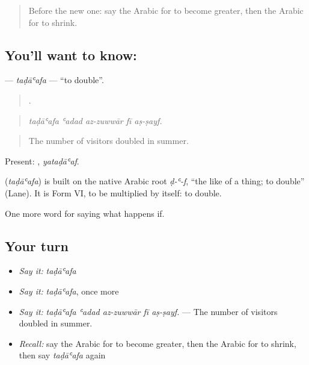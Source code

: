 \label{lesson:AR-C412-tadaafa}



\begin{quote}
Before the new one: say the Arabic for to become greater, then the Arabic for to shrink.
\end{quote}

\subsection*{You'll want to know: }
\textbf{} — \emph{taḍāʿafa} — \textquotedblleft{}to double\textquotedblright{}.

\begin{quote}
    .
\end{quote}

\begin{quote}
\emph{taḍāʿafa ʿadad az-zuwwār fī aṣ-ṣayf.}
\end{quote}

\begin{quote}
The number of visitors doubled in summer.
\end{quote}

Present: , \emph{yataḍāʿaf}.

\begin{cousinweb}
\textbf{} (\emph{taḍāʿafa}) is built on the native Arabic root \emph{ḍ-ʿ-f}, \textquotedblleft{}the like of a thing; to double\textquotedblright{} (Lane). It is Form VI, to be multiplied by itself: to double.
\end{cousinweb}

\begin{grammarlens}[title={What you've built}]
One more word for saying what happens if.
\end{grammarlens}

\subsection*{Your turn}
\begin{itemize}
\raggedright
  \item \emph{Say it:} \emph{taḍāʿafa}
  \item \emph{Say it:} \emph{taḍāʿafa}, once more
  \item \emph{Say it:} \emph{taḍāʿafa ʿadad az-zuwwār fī aṣ-ṣayf.} — The number of visitors doubled in summer.
  \item \emph{Recall:} say the Arabic for to become greater, then the Arabic for to shrink, then say \emph{taḍāʿafa} again
\end{itemize}


